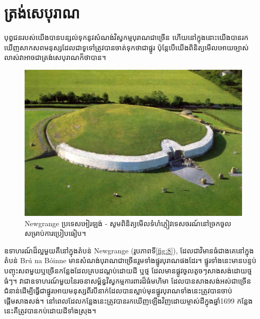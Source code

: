 \documentclass[10pt,twocolumn,letterpaper]{article}
\begin{document}
\section{ត្រង់សេបុរាណ}

បុព្វជនរបស់យើងបានបន្សល់ទុកនូវសំណង់វិស្វកម្មបុរាណជាច្រើន ហើយនៅក្នុងនោះយើងបានរកឃើញសាកសពមនុស្សដែលជាទូទៅត្រូវបានចាត់ទុកថាជាផ្នូរ ប៉ុន្តែបើយើងពិនិត្យមើលអោយច្បាស់លាស់វាអាចជាត្រង់សេបុរាណក៏ថាបាន។

\begin{figure}[b]
\begin{center}
   \includegraphics[width=1\linewidth]{ww19.jpg}
\end{center}
   \caption{Newgrange ប្រទេសអៀរឡង់ - សូមពិនិត្យមើលទំហំភ្ញៀវទេសចរណ៍នៅច្រកចូលសម្រាប់ការប្រៀបធៀប។}
\label{fig:8}
\label{fig:onecol}
\end{figure}

ឧទាហរណ៍ដ៏ល្អមួយគឺនៅក្នុងតំបន់ Newgrange (រូបភាពទី\ref{fig:8}), ដែលជាវិមានធំជាងគេនៅក្នុងតំបន់ Brú na Bóinne មានសំណង់បុរាណជាច្រើនរួមទាំងផ្នូរបុរាណផងដែរ។ ផ្នូរទាំងនេះមានបន្ទប់បញ្ចុះសពមួយឬច្រើនកន្លែងដែលគ្របដណ្តប់ដោយដី ឬថ្ម ដែលមានផ្លូវចូលតូចៗសាងសង់ដោយថ្មធំៗ\cite{70}។ វាជាឧទាហរណ៍មួយនៃរចនាសម្ព័ន្ធវិស្វកម្មការពារដ៏ធំមហិមា ដែលបានសាងសង់អស់ជាច្រើនជំនាន់ដើម្បីធ្វើជាផ្នូរអោយមនុស្សពីរបីនាក់ដែលបានស្លាប់មុនផ្នូរបុរាណទាំងនេះត្រូវបានចាប់ផ្តើមសាងសង់។ នៅពេលដែលកន្លែងនេះត្រូវបានរកឃើញឡើងវិញដោយម្ចាស់ដីក្នុងឆ្នាំ1699 កន្លែងនេះគឺត្រូវបានកប់ដោយដីទាំងស្រុង។
\end{document}
